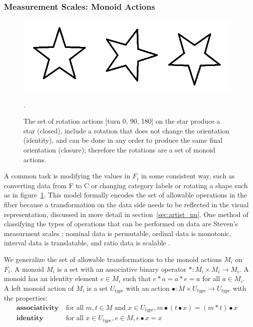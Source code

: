 \documentclass[../main.tex]{subfiles}
\begin{document}
\subsubsection{Measurement Scales: Monoid Actions}
\label{sec:data_monoid}


\begin{figure}[ht!]
    \includegraphics[width=\textwidth]{figures/math/rotation_actions.png}
    \label{fig:data_monoid_rotation}
    \caption{The set of rotation actions [turn 0, 90, 180] on the star produce a star (closed), include a rotation that does not change the orientation (identity), and can be done in any order to produce the same final orientation (closure); therefore the rotations are a set of monoid actions.}.  
\end{figure}

A common task is modifying the values in $F_i$ in some consistent way, such as converting data from \textdegree F to \textdegree C or changing category labels or rotating a shape such as in figure~\ref{fig:data_monoid_rotation}. This model formally encodes the set of allowable operations in the fiber because a transformation on the data side needs to be reflected in the visual representation, discussed in more detail in section~\ref{sec:artist_nu}. One method of classifying the types of operations that can be performed on data are Steven's measurment scales \cite{stevensTheoryScalesMeasurement1946,leaFormalizationMeasurementScale}; nominal data is permutable, ordinal data is monotonic, interval data is translatable, and ratio data is scalable \cite{weissteinSimilarityTransformation}.

We generalize the set of allowable transformations to the monoid actions $M_i$ on $F_i$. A monoid \cite{Monoid2021} $M_i$ is a set with an associative binary operator $\ast:M_i \times M_i\rightarrow M_i$. A monoid has an identity element $e\in M_i$ such that $e\ast a= a \ast e = a$ for all $a \in M_i$. A left monoid action \cite{SemigroupAction2021,ActionNLab} of $M_i$ is a set $U_{type}$ with an action $\bullet: M\times U_{type} \rightarrow U_{type}$ with the properties:
\begin{align*}
    \textbf{associativity}\;& \text{for all } m,t \in M \text{ and } x\in U_{type}, m\bullet(t\bullet x) = (m\ast t) \bullet x\\
    \textbf{identity}\;& \text{for all } x\in U_{type}, e\in M,  e\bullet x = x 
\end{align*}
\end{document}
